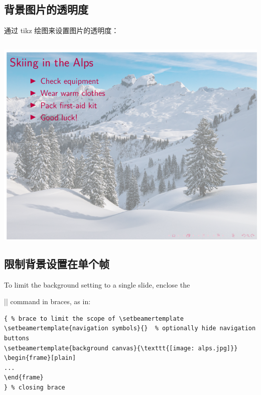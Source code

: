 \begin{column}{0.5\textwidth}
\subsection{背景图片的透明度}

通过 tikz 绘图来设置图片的透明度：

\inputminted[linenos=true]{latex}{examples/beamer/theme-background-figure-opacity.tex}

\includegraphics{examples/beamer/theme-background-figure-opacity.pdf}

\subsection{限制背景设置在单个帧}

To limit the background setting to a single slide, enclose the 

||
command in braces, as in:

\begin{verbatim}
{ % brace to limit the scope of \setbeamertemplate 
\setbeamertemplate{navigation symbols}{}  % optionally hide navigation buttons 
\setbeamertemplate{background canvas}{\texttt{[image: alps.jpg]}} 
\begin{frame}[plain] 
... 
\end{frame} 
} % closing brace 
\end{verbatim}


\end{column}
